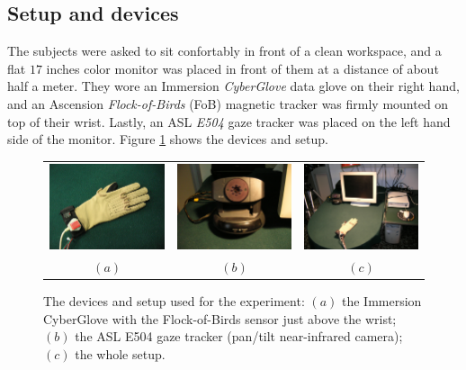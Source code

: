 \documentclass[jou,a4paper,notxfonts]{apa}
\begin{document}
\subsection{Setup and devices}

The subjects were asked to sit confortably in front of a clean
workspace, and a flat $17$ inches color monitor was placed in front of
them at a distance of about half a meter. They wore an Immersion
\emph{CyberGlove} data glove \cite{cyberglove} on their right hand,
and an Ascension \emph{Flock-of-Birds} (FoB) \cite{fob} magnetic
tracker was firmly mounted on top of their wrist. Lastly, an ASL
\emph{E504} gaze tracker \cite{e504} was placed on the left hand side
of the monitor. Figure \ref{fig:devices} shows the devices and setup.

\begin{figure}[ht]
  \centering
    \begin{tabular}{ccc}
      \includegraphics[width=0.295\linewidth]{figs/glove.eps} &
      \includegraphics[width=0.295\linewidth]{figs/e504.eps} &
      \includegraphics[width=0.295\linewidth]{figs/setup.eps} \\
      $(a)$ & $(b)$ & $(c)$
    \end{tabular}
    \caption{The devices and setup used for the experiment: $(a)$ the
    Immersion CyberGlove with the Flock-of-Birds sensor just above the
    wrist; $(b)$ the ASL E504 gaze tracker (pan/tilt near-infrared
    camera); $(c)$ the whole setup.}
    \label{fig:devices}
\end{figure}
\end{document}
